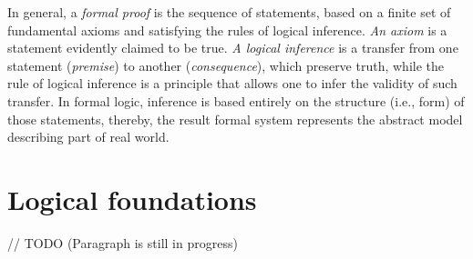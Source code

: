 \documentclass[article]{aaltoseries}
\begin{document}
In general, a \textit{formal proof} is the sequence of statements, based on a finite set of fundamental axioms and satisfying the rules of logical inference. \textit{An axiom} is a statement evidently claimed to be true. \textit{A logical inference} is a transfer from one statement (\textit{premise}) to another (\textit{consequence}), which preserve truth, while the rule of logical inference is a principle that allows one to infer the validity of such transfer.
In formal logic, inference is based entirely on the structure (i.e., form) of those statements, thereby, the result formal system represents the abstract model describing part of real world.



\section{Logical foundations}
\label{sec:formal_theory}

// TODO (Paragraph is still in progress)
\end{document}
